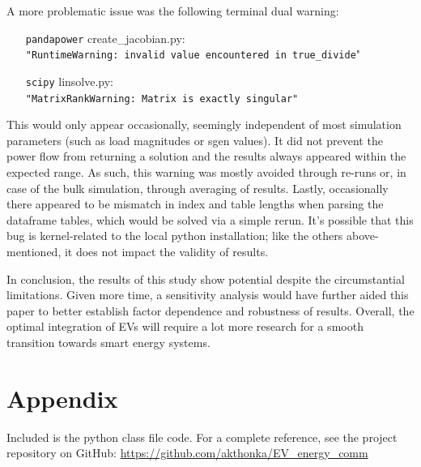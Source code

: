 \documentclass[a4paper,10pt]{report}
\begin{document}
A more problematic issue was the following terminal dual warning:
\noindent
\begin{itemize}[leftmargin=2.1cm]
	\item[\texttt{pandapower}] create\_jacobian.py:\\
	\texttt{"RuntimeWarning: invalid value encountered in true\_divide}"
	\item[\texttt{scipy}] linsolve.py:\\
	\texttt{"MatrixRankWarning: Matrix is exactly singular"}
\end{itemize}
This would only appear occasionally, seemingly independent of most simulation parameters (such as load magnitudes or sgen values). It did not prevent the power flow from returning a solution and the results always appeared within the expected range. As such, this warning was mostly avoided through re-runs or, in case of the bulk simulation, through averaging of results. Lastly, occasionally there appeared to be mismatch in index and table lengths when parsing the dataframe tables, which would be solved via a simple rerun. It's possible that this bug is kernel-related to the local python installation; like the others above-mentioned, it does not impact the validity of results.

In conclusion, the results of this study show potential despite the circumstantial limitations. Given more time, a sensitivity analysis would have further aided this paper to better establish factor dependence and robustness of results. Overall, the optimal integration of EVs will require a lot more research for a smooth transition towards smart energy systems.



\chapter*{Appendix}\label{chapter_appendix}
Included is the python class file code. For a complete reference, see the project repository on GitHub: \url{https://github.com/akthonka/EV_energy_comm}


\end{document}
